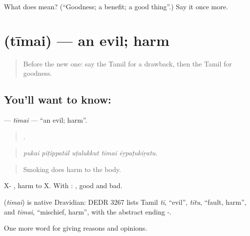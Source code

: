 \begin{tcolorbox}[breakable,colback=teal!4,colframe=teal!35!black,title={Before you move on}]
What does  mean? (\textquotedblleft{}Goodness; a benefit; a good thing\textquotedblright{}.) Say it once more.
\end{tcolorbox}
\section[\texorpdfstring{\ta{தீமை} (tīmai)}{தீமை (tīmai)}]{ (tīmai) — an evil; harm}

\label{lesson:TA-C353-timai}



\begin{quote}
Before the new one: say the Tamil for a drawback, then the Tamil for goodness.
\end{quote}

\subsection*{You'll want to know: }
\textbf{} — \emph{tīmai} — \textquotedblleft{}an evil; harm\textquotedblright{}.

\begin{quote}
    .
\end{quote}

\begin{quote}
\emph{pukai piṭippatāl uṭalukkut tīmai ēṟpaṭukiṟatu.}
\end{quote}

\begin{quote}
Smoking does harm to the body.
\end{quote}

X- , harm to X. With :  , good and bad.

\begin{cousinweb}
\textbf{} (\emph{tīmai}) is native Dravidian: DEDR 3267 lists Tamil \emph{tī}, \textquotedblleft{}evil\textquotedblright{}, \emph{tītu}, \textquotedblleft{}fault, harm\textquotedblright{}, and \emph{tīmai}, \textquotedblleft{}mischief, harm\textquotedblright{}, with the abstract ending -.
\end{cousinweb}

\begin{grammarlens}[title={What you've built}]
One more word for giving reasons and opinions.
\end{grammarlens}

